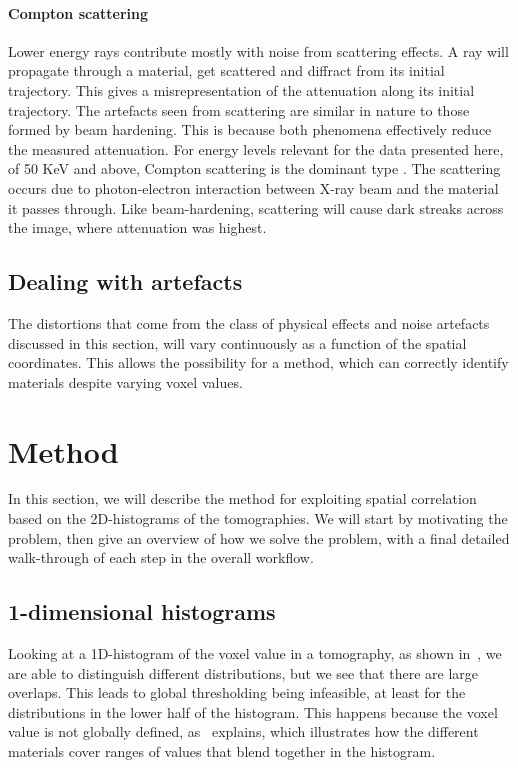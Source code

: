 \documentclass[pdflatex,sn-mathphys]{sn-jnl}%
\theoremstyle{thmstyleone}%
\theoremstyle{thmstyletwo}%
\theoremstyle{thmstylethree}%
\begin{document}
\paragraph{Compton scattering} Lower energy rays contribute mostly with noise from scattering
effects. A ray will propagate through a material, get scattered and diffract from its initial
trajectory. This gives a misrepresentation of the attenuation along its initial trajectory. The
artefacts seen from scattering are similar in nature to those formed by beam hardening. This is
because both phenomena effectively reduce the measured attenuation. For energy levels relevant for
the data presented here, of 50 KeV and above, Compton scattering is the dominant type
\citep{Compton}.  The scattering occurs due to photon-electron interaction between X-ray beam and
the material it passes through. Like beam-hardening, scattering will cause dark streaks across the
image, where attenuation was highest.

\subsection{Dealing with artefacts}
\label{sec:dealwithit}

The distortions that come from the class of physical effects and noise artefacts discussed in this
section, will vary continuously as a function of the spatial coordinates. This allows the possibility
for a method, which can correctly identify materials despite varying voxel values.


\section{Method}\label{sec:method}
In this section, we will describe the method for exploiting spatial correlation based on the
2D-histograms of the tomographies. We will start by motivating the problem, then give an overview
of how we solve the problem, with a final detailed walk-through of each step in the overall workflow.

\subsection{1-dimensional histograms}
Looking at a 1D-histogram of the voxel value in a tomography, as shown in~, we are
able to distinguish different distributions, but we see that there are large overlaps. This leads to
global thresholding being infeasible, at least for the distributions in the lower half of the histogram.
This happens because the voxel value is not globally defined, as~ explains, which
illustrates how the different materials cover ranges of values that blend together in the histogram.
\end{document}
